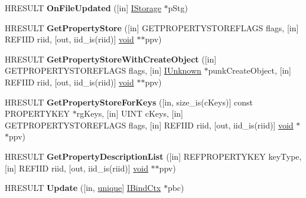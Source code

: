 \begin{DoxyCompactItemize}
\item 
\mbox{\label{interfaceenum_a30bbdac3abfc30d5b37972e575528e26}} 
H\+R\+E\+S\+U\+LT {\bfseries On\+File\+Updated} (\mbox{[}in\mbox{]} \hyperlink{interface_i_storage}{I\+Storage} $\ast$p\+Stg)
\item 
\mbox{\label{interfaceenum_a58bb8a0a465bc26203e3e78924b9cdad}} 
H\+R\+E\+S\+U\+LT {\bfseries Get\+Property\+Store} (\mbox{[}in\mbox{]} G\+E\+T\+P\+R\+O\+P\+E\+R\+T\+Y\+S\+T\+O\+R\+E\+F\+L\+A\+GS flags, \mbox{[}in\mbox{]} R\+E\+F\+I\+ID riid, \mbox{[}out, iid\+\_\+is(riid)\mbox{]} \hyperlink{interfacevoid}{void} $\ast$$\ast$ppv)
\item 
\mbox{\label{interfaceenum_aa402645aa3e89629104438fab4a1de9c}} 
H\+R\+E\+S\+U\+LT {\bfseries Get\+Property\+Store\+With\+Create\+Object} (\mbox{[}in\mbox{]} G\+E\+T\+P\+R\+O\+P\+E\+R\+T\+Y\+S\+T\+O\+R\+E\+F\+L\+A\+GS flags, \mbox{[}in\mbox{]} \hyperlink{interface_i_unknown}{I\+Unknown} $\ast$punk\+Create\+Object, \mbox{[}in\mbox{]} R\+E\+F\+I\+ID riid, \mbox{[}out, iid\+\_\+is(riid)\mbox{]} \hyperlink{interfacevoid}{void} $\ast$$\ast$ppv)
\item 
\mbox{\label{interfaceenum_a6f563c25ea11bc4829a0c396e681c5ed}} 
H\+R\+E\+S\+U\+LT {\bfseries Get\+Property\+Store\+For\+Keys} (\mbox{[}in, size\+\_\+is(c\+Keys)\mbox{]} const P\+R\+O\+P\+E\+R\+T\+Y\+K\+EY $\ast$rg\+Keys, \mbox{[}in\mbox{]} U\+I\+NT c\+Keys, \mbox{[}in\mbox{]} G\+E\+T\+P\+R\+O\+P\+E\+R\+T\+Y\+S\+T\+O\+R\+E\+F\+L\+A\+GS flags, \mbox{[}in\mbox{]} R\+E\+F\+I\+ID riid, \mbox{[}out, iid\+\_\+is(riid)\mbox{]} \hyperlink{interfacevoid}{void} $\ast$$\ast$ppv)
\item 
\mbox{\label{interfaceenum_a829869bc8603b9810ae4286e4bd6c5e0}} 
H\+R\+E\+S\+U\+LT {\bfseries Get\+Property\+Description\+List} (\mbox{[}in\mbox{]} R\+E\+F\+P\+R\+O\+P\+E\+R\+T\+Y\+K\+EY key\+Type, \mbox{[}in\mbox{]} R\+E\+F\+I\+ID riid, \mbox{[}out, iid\+\_\+is(riid)\mbox{]} \hyperlink{interfacevoid}{void} $\ast$$\ast$ppv)
\item 
\mbox{\label{interfaceenum_a8dd554aa3b78ff3eb93cf69869541aae}} 
H\+R\+E\+S\+U\+LT {\bfseries Update} (\mbox{[}in, \hyperlink{interfaceunique}{unique}\mbox{]} \hyperlink{interface_i_bind_ctx}{I\+Bind\+Ctx} $\ast$pbc)

\end{DoxyCompactItemize}
